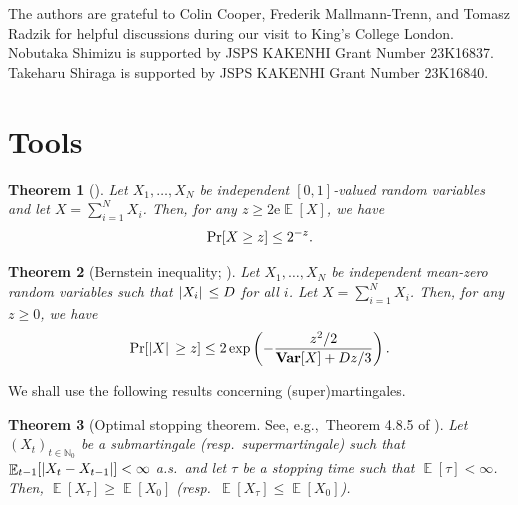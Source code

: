 \documentclass[letterpaper,11pt]{article}
\newtheorem{theorem}{Theorem}[section]
\DeclarePairedDelimiter{\sbra}{\lbrack}{\rbrack} %
\DeclareMathOperator*{\E}{\mathbb{E}}
\DeclareMathOperator*{\Var}{\mathbf{Var}}
\newcommand{\e}{\mathrm{e}}
\newcommand{\bounded}{D}
\begin{document}
The authors are grateful to Colin Cooper, Frederik Mallmann-Trenn, and Tomasz Radzik for helpful discussions during our visit to King's College London.
Nobutaka Shimizu is supported by JSPS KAKENHI Grant Number 23K16837.
Takeharu Shiraga is supported by JSPS KAKENHI Grant Number 23K16840.

\printbibliography
\appendix

\section{Tools}
\begin{theorem}[\mbox{\cite[Corollary 1.10.4]{Doe18}}]
  \label{thm:Chernoff}
  Let $X_1, \ldots, X_N$ be independent $[0,1]$-valued random variables and let $X=\sum_{i=1}^NX_i$.
  Then, for any $z\geq 2\e\E[X]$, we have
  \begin{align*}
    \Pr\sbra*{X\geq z}\leq 2^{-z}.
  \end{align*}
\end{theorem}
\begin{theorem}[Bernstein inequality; \mbox{\cite[Theorem 2.8.4]{Ver18}}]
  \label{thm:Bernstein}
  Let $X_1, \ldots, X_N$ be independent mean-zero random variables such that $\abs*{X_i}\leq \bounded$ for all $i$.
  Let $X=\sum_{i=1}^NX_i$.
  Then, for any $z\geq 0$, we have
  \begin{align*}
    \Pr\sbra*{\abs*{X}\geq z}\leq 2\exp\left(-\frac{z^2/2}{\Var[X]+\bounded z/3}\right).
  \end{align*}
\end{theorem}
We shall use the following results concerning (super)martingales.
\begin{theorem}[Optimal stopping theorem. See, e.g.,~Theorem 4.8.5 of \cite{Dur19}]\label{thm:OST}
        Let $(X_t)_{t\in \mathbb{N}_0}$ be a submartingale (resp.\ supermartingale) such that $\E_{t-1}\sbra*{|X_t-X_{t-1}|}<\infty$ a.s.\
        and let $\tau$ be a stopping time such that $\E[\tau]<\infty$.
        Then, $\E[X_\tau]\geq \E[X_0]$ (resp.\ $\E[X_\tau]\leq \E[X_0]$).
\end{theorem}
\end{document}
